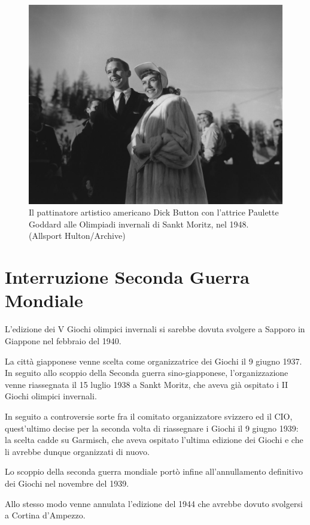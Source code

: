 \documentclass[
]{book}
\begin{document}
\begin{figure}
\includegraphics[width=0.8\linewidth]{images/IlPost/1948} \caption{Il pattinatore artistico americano Dick Button con l'attrice Paulette Goddard alle Olimpiadi invernali di Sankt Moritz, nel 1948. (Allsport Hulton/Archive)}\label{fig:unnamed-chunk-14}
\end{figure}

\section*{Interruzione Seconda Guerra Mondiale}\label{interruzione-seconda-guerra-mondiale}

L'edizione dei V Giochi olimpici invernali si sarebbe dovuta svolgere a Sapporo in Giappone nel febbraio del 1940.

La città giapponese venne scelta come organizzatrice dei Giochi il 9 giugno 1937. In seguito allo scoppio della Seconda guerra sino-giapponese, l'organizzazione venne riassegnata il 15 luglio 1938 a Sankt Moritz, che aveva già ospitato i II Giochi olimpici invernali.

In seguito a controversie sorte fra il comitato organizzatore svizzero ed il CIO, quest'ultimo decise per la seconda volta di riassegnare i Giochi il 9 giugno 1939: la scelta cadde su Garmisch, che aveva ospitato l'ultima edizione dei Giochi e che li avrebbe dunque organizzati di nuovo.

Lo scoppio della seconda guerra mondiale portò infine all'annullamento definitivo dei Giochi nel novembre del 1939.

Allo stesso modo venne annulata l'edizione del 1944 che avrebbe dovuto svolgersi a Cortina d'Ampezzo.
\end{document}
